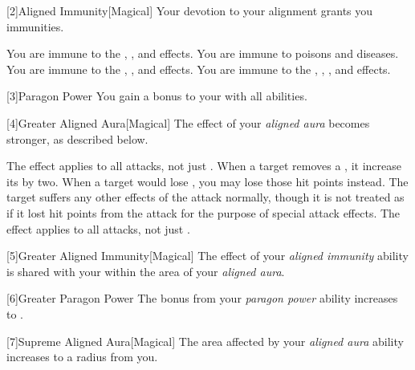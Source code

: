         [2]{Aligned Immunity}[Magical]
        Your devotion to your alignment grants you immunities.

         You are immune to the \slowed, \decelerated, and \immobilized effects.
         You are immune to poisons and diseases.
         You are immune to the \shaken, \frightened, and \panicked effects.
         You are immune to the \dazed, \stunned, \disoriented, and \confused effects.

        [3]{Paragon Power}
        You gain a  bonus to your  with all abilities.

        [4]{Greater Aligned Aura}[Magical]
        The effect of your \textit{aligned aura} becomes stronger, as described below.

         The effect applies to all attacks, not just .
         When a target removes a , it increase its  by two.
         When a target would lose , you may lose those hit points instead.
        The target suffers any other effects of the attack normally, though it is not treated as if it lost hit points from the attack for the purpose of special attack effects.
         The effect applies to all attacks, not just .

        [5]{Greater Aligned Immunity}[Magical]
        The effect of your \textit{aligned immunity} ability is shared with your  within the area of your \textit{aligned aura}.

        [6]{Greater Paragon Power} The bonus from your \textit{paragon power} ability increases to .

        [7]{Supreme Aligned Aura}[Magical]
        The area affected by your \textit{aligned aura} ability increases to a \gargarea radius  from you.



